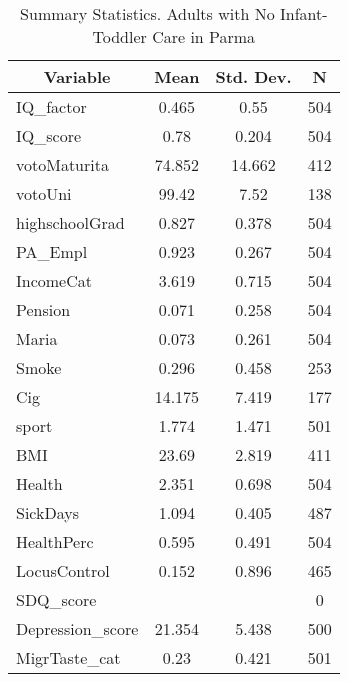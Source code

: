 
\begin{table}[htbp]\centering \caption{Summary Statistics. Adults with No Infant-Toddler Care in Parma \label{bothAdultasiloNoneParma}}
\begin{tabular}{l c c  c}\hline\hline
\multicolumn{1}{c}{\textbf{Variable}} & \textbf{Mean}
 & \textbf{Std. Dev.} & \textbf{N}\\ \hline
IQ\_factor & 0.465 & 0.55  & 504\\
IQ\_score & 0.78 & 0.204  & 504\\
votoMaturita & 74.852 & 14.662  & 412\\
votoUni & 99.42 & 7.52  & 138\\
highschoolGrad & 0.827 & 0.378  & 504\\
PA\_Empl & 0.923 & 0.267  & 504\\
IncomeCat & 3.619 & 0.715  & 504\\
Pension & 0.071 & 0.258  & 504\\
Maria & 0.073 & 0.261  & 504\\
Smoke & 0.296 & 0.458  & 253\\
Cig & 14.175 & 7.419  & 177\\
sport & 1.774 & 1.471  & 501\\
BMI & 23.69 & 2.819  & 411\\
Health & 2.351 & 0.698  & 504\\
SickDays & 1.094 & 0.405  & 487\\
HealthPerc & 0.595 & 0.491  & 504\\
LocusControl & 0.152 & 0.896  & 465\\
SDQ\_score &  &   & 0\\
Depression\_score & 21.354 & 5.438  & 500\\
MigrTaste\_cat & 0.23 & 0.421  & 501\\
\hline\end{tabular}
\end{table}
